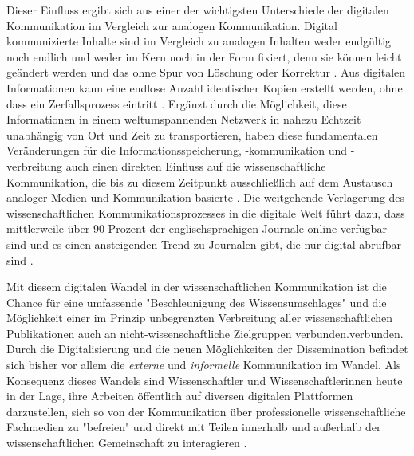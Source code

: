 Dieser Einfluss ergibt sich aus einer der wichtigsten Unterschiede der digitalen Kommunikation im Vergleich zur analogen Kommunikation. Digital kommunizierte Inhalte sind im Vergleich zu analogen Inhalten weder endgültig noch endlich und weder im Kern noch in der Form fixiert, denn sie können leicht geändert werden und das ohne Spur von Löschung oder Korrektur \cite{smith_1999_digitize}. Aus digitalen Informationen kann eine endlose Anzahl identischer Kopien erstellt werden, ohne dass ein Zerfallsprozess eintritt \cite{smith_1999_digitize}. Ergänzt durch die Möglichkeit, diese Informationen in einem weltumspannenden Netzwerk in nahezu Echtzeit unabhängig von Ort und Zeit zu transportieren, haben diese fundamentalen Veränderungen für die Informationsspeicherung, -kommunikation und -verbreitung auch einen direkten Einfluss auf die wissenschaftliche Kommunikation, die bis zu diesem Zeitpunkt ausschließlich auf dem Austausch analoger Medien und Kommunikation basierte \cite{seidenfaden_2005_kommunikation}. Die weitgehende Verlagerung des wissenschaftlichen Kommunikationsprozesses in die digitale Welt führt dazu, dass mittlerweile über 90 Prozent der englischsprachigen Journale online verfügbar sind und es einen ansteigenden Trend zu Journalen gibt, die nur digital abrufbar sind \cite{cope2014future} \cite{cite:5}.

Mit diesem digitalen Wandel in der wissenschaftlichen Kommunikation ist die Chance für eine umfassende "Beschleunigung des Wissensumschlages" \cite{Wenzel_2003} und die Möglichkeit einer im Prinzip unbegrenzten Verbreitung aller wissenschaftlichen Publikationen \cite{bbaw_publizieren_2015} \cite{yiotis_2013_open} auch an nicht-wissenschaftliche Zielgruppen \cite{Konneker_2013} verbunden.verbunden. Durch die Digitalisierung und die neuen Möglichkeiten der Dissemination befindet sich bisher vor allem die \textit{externe} und \textit{informelle} Kommunikation im Wandel. Als Konsequenz dieses Wandels sind Wissenschaftler und Wissenschaftlerinnen heute in der Lage, ihre Arbeiten öffentlich auf diversen digitalen Plattformen darzustellen, sich so von der Kommunikation über professionelle wissenschaftliche Fachmedien zu "befreien" und direkt mit Teilen innerhalb und außerhalb der wissenschaftlichen Gemeinschaft zu interagieren \cite{Konneker_2013}.

